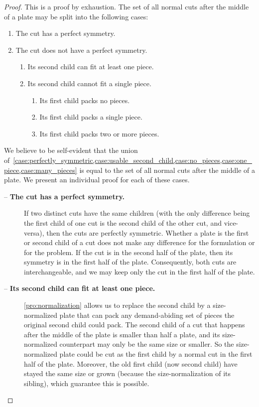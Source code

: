 \documentclass[smallextended]{svjour3}       %
\begin{document}
\begin{proof}
This is a proof by exhaustion. The set of all normal cuts after the middle of a plate may be split into the following cases:
\begin{enumerate}
  \item The cut has a perfect symmetry. \label{case:perfectly_symmetric}
  \item The cut does not have a perfect symmetry.
  \begin{enumerate}
    \item Its second child can fit at least one piece. \label{case:usable_second_child}
    \item Its second child cannot fit a single piece.
    \begin{enumerate}
      \item Its first child packs no pieces. \label{case:no_pieces}
      \item Its first child packs a single piece. \label{case:one_piece} %
      \item Its first child packs two or more pieces. \label{case:many_pieces}
    \end{enumerate}
  \end{enumerate}
\end{enumerate}

We believe to be self-evident that the union of~\cref{case:perfectly_symmetric,case:usable_second_child,case:no_pieces,case:one_piece,case:many_pieces} is equal to the set of all normal cuts after the middle of a plate. We present an individual proof for each of these cases.

\begin{description}
\item[ -- \textbf{The cut has a perfect symmetry.}]
If two distinct cuts have the same children (with the only difference being the first child of one cut is the second child of the other cut, and vice-versa), then the cuts are perfectly symmetric.
Whether a plate is the first or second child of a cut does not make any difference for the formulation or for the problem.
If the cut is in the second half of the plate, then its symmetry is in the first half of the plate.
Consequently, both cuts are interchangeable, and we may keep only the cut in the first half of the plate.
\item[ -- \textbf{Its second child can fit at least one piece.}]
\autoref{pro:normalization} allows us to replace the second child by a size-normalized plate that can pack any demand-abiding set of pieces the original second child could pack.
The second child of a cut that happens after the middle of the plate is smaller than half a plate, and its size-normalized counterpart may only be the same size or smaller.
So the size-normalized plate could be cut as the first child by a normal cut in the first half of the plate.
Moreover, the old first child (now second child) have stayed the same size or grown (because the size-normalization of its sibling), which guarantee this is possible.


\end{description}
\end{proof}
\end{document}
